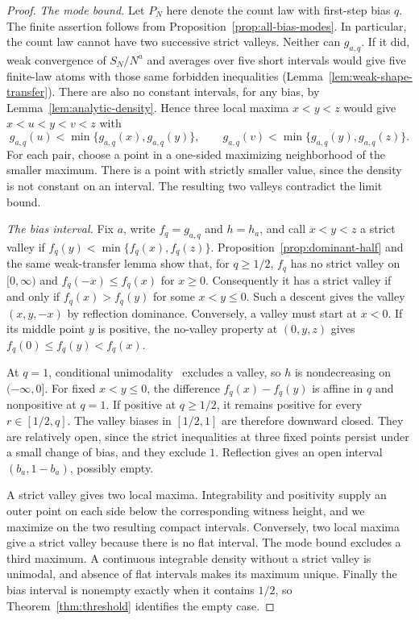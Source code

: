\begin{proof}
\emph{The mode bound.} Let $P_N$ here denote the count law with first-step bias $q$.
The finite assertion follows from Proposition~\ref{prop:all-bias-modes}.
In particular, the count law cannot have two successive strict valleys.
Neither can $g_{a,q}$. If it did, weak convergence of $S_N/N^a$ and
averages over five short intervals would give five finite-law atoms
with those same forbidden inequalities
(Lemma~\ref{lem:weak-shape-transfer}).
There are also no constant intervals, for any bias, by
Lemma~\ref{lem:analytic-density}. Hence three local maxima $x<y<z$
would give
$x<u<y<v<z$ with
\[
 g_{a,q}(u)<\min\{g_{a,q}(x),g_{a,q}(y)\},\qquad
 g_{a,q}(v)<\min\{g_{a,q}(y),g_{a,q}(z)\}.
\]
For each pair, choose a point in a one-sided maximizing neighborhood
of the smaller maximum. There is a point with strictly smaller value,
since the density is not constant on an interval. The resulting two
valleys contradict the limit bound.

\emph{The bias interval.} Fix $a$, write $f_q=g_{a,q}$ and $h=h_a$,
and call $x<y<z$ a strict valley if $f_q(y)<\min\{f_q(x),f_q(z)\}$.
Proposition~\ref{prop:dominant-half} and the same weak-transfer lemma show that,
for $q\ge1/2$, $f_q$ has no strict valley on $[0,\infty)$ and
$f_q(-x)\le f_q(x)$ for $x\ge0$.
Consequently it has a strict valley if and only if
$f_q(x)>f_q(y)$ for some $x<y\le0$. Such a descent gives the valley
$(x,y,-x)$ by reflection dominance. Conversely, a valley must start at $x<0$. If its middle point $y$
is positive, the no-valley property at $(0,y,z)$ gives
$f_q(0)\le f_q(y)<f_q(x)$.

At $q=1$, conditional unimodality~\cite{glrs2025} excludes a valley,
so $h$ is nondecreasing on $(-\infty,0]$. For fixed $x<y\le0$, the
difference $f_q(x)-f_q(y)$ is affine in $q$ and nonpositive at $q=1$.
If positive at $q\ge1/2$, it remains positive for every $r\in[1/2,q]$.
The valley biases in $[1/2,1]$ are therefore downward closed. They are
relatively open, since the strict inequalities at three fixed points
persist under a small change of bias, and they exclude $1$. Reflection
gives an open interval $(b_a,1-b_a)$, possibly empty.

A strict valley gives two local maxima. Integrability and positivity
supply an outer point on each side below the corresponding witness
height, and we maximize on the two resulting compact intervals. Conversely, two local
maxima give a strict valley because there is no flat interval.
The mode bound excludes a third maximum. A continuous integrable
density without a strict valley is unimodal, and absence of flat
intervals makes its maximum unique. Finally the bias interval is
nonempty exactly when it contains $1/2$, so
Theorem~\ref{thm:threshold} identifies the empty case.
\end{proof}

